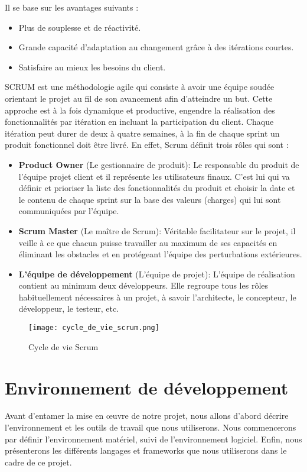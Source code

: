 Il se base sur les avantages suivants :

\begin{itemize}
  \item Plus de souplesse et de réactivité.
  \item Grande capacité d'adaptation au changement grâce à des itérations courtes.
  \item Satisfaire au mieux les besoins du client.
\end{itemize}



SCRUM est une méthodologie agile qui consiste à avoir une équipe soudée orientant le projet au fil de son avancement afin d'atteindre un but. Cette approche est à la fois dynamique et productive, engendre la réalisation des fonctionnalités par itération en incluant la participation du client. Chaque itération peut durer de deux à quatre semaines, à la fin de chaque sprint un produit fonctionnel doit être livré. En effet, Scrum définit trois rôles qui sont :

\begin{itemize}
  \item \textbf{Product Owner }(Le gestionnaire de produit):
  Le responsable du produit de l'équipe projet client et il représente les utilisateurs finaux. C'est lui qui va définir et prioriser la liste des fonctionnalités du produit et choisir la date et le contenu de chaque sprint sur la base des valeurs (charges) qui lui sont communiquées par l'équipe.
  \item \textbf{Scrum Master} (Le maître de Scrum):
  Véritable facilitateur sur le projet, il veille à ce que chacun puisse travailler au maximum de ses capacités en éliminant les obstacles et en protégeant l'équipe des perturbations extérieures.
  \item \textbf{L'équipe de développement} (L'équipe de projet):
  L'équipe de réalisation contient au minimum deux développeurs. Elle regroupe tous les rôles habituellement nécessaires à un projet, à savoir l'architecte, le concepteur, le développeur, le testeur, etc.
\end{itemize}

\begin{figure}[!h]
  \centering
  \texttt{[image: cycle\_de\_vie\_scrum.png]}
  \caption{Cycle de vie Scrum}
  \label{fig:cycle_de_vie_scrum}
\end{figure}

\section{Environnement de développement}
Avant d'entamer la mise en œuvre de notre projet, nous allons d'abord décrire l'environnement et les outils de travail que nous utiliserons. Nous commencerons par définir l'environnement matériel, suivi de l'environnement logiciel. Enfin, nous présenterons les différents langages et frameworks que nous utiliserons dans le cadre de ce projet.


